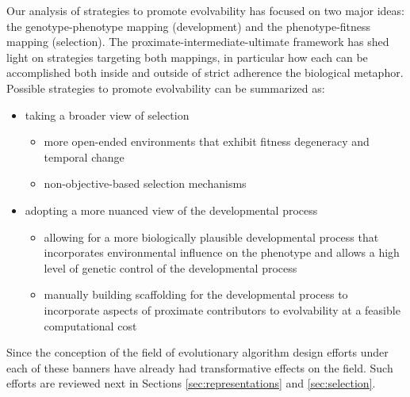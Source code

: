 Our analysis of strategies to promote evolvability has focused on two major ideas: the genotype-phenotype mapping (development) and the phenotype-fitness mapping (selection). The proximate-intermediate-ultimate framework has shed light on strategies targeting both mappings, in particular how each can be accomplished both inside and outside of strict adherence the biological metaphor. Possible strategies to promote evolvability can be summarized as:
\begin{itemize}
\item taking a broader view of selection 
\begin{itemize}
\item more open-ended environments that exhibit fitness degeneracy and temporal change
\item non-objective-based selection mechanisms
\end{itemize} 
\item adopting a more nuanced view of the developmental process
\begin{itemize}
\item allowing for a more biologically plausible developmental process that incorporates environmental influence on the phenotype and allows a high level of genetic control of the developmental process
\item manually building scaffolding for the developmental process to incorporate aspects of proximate contributors to evolvability at a feasible computational cost
\end{itemize}
\end{itemize}
Since the conception of the field of evolutionary algorithm design efforts under each of these banners have already had transformative effects on the field. Such efforts are reviewed next in Sections \ref{sec:representations} and \ref{sec:selection}. 

